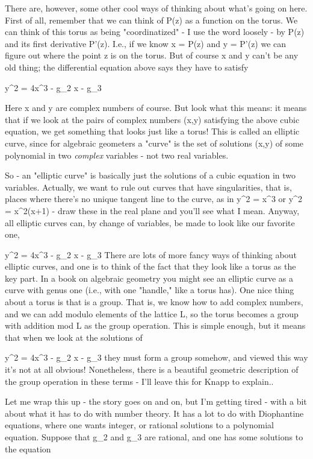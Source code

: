 There are, however, some other cool ways of thinking about what's going
on here.  First of all, remember that we can think of P(z) as a function
on the torus.  We can think of this torus as being "coordinatized" - I
use the word loosely - by P(z) and its first derivative P'(z).  I.e., if
we know x = P(z) and y = P'(z) we can figure out where the point z is on
the torus.  But of course x and y can't be any old thing; the
differential equation above says they have to satisfy

   y^{2} = 4x^{3} - g_{2} x - g_{3}

Here x and y are complex numbers of course.  But look what this means:
it means that if we look at the pairs of complex numbers (x,y)
satisfying the above cubic equation, we get something
that looks just like a torus!  This is called an elliptic curve, since
for algebraic geometers a "curve" is the set of solutions (x,y) of some
polynomial in two \emph{complex} variables - not two real variables.  

So - an "elliptic curve" is basically just the solutions of a cubic equation in
two variables.   Actually, we want to rule out curves that have
singularities, that is, places where there's no unique tangent line to
the curve, as in y^{2} = x^{3} or y^{2} = x^{2}(x+1) - draw these in the real
plane and you'll see what I mean.  Anyway, all elliptic curves can, by
change of variables, be made to look like our favorite one, 


   y^{2} = 4x^{3} - g_{2} x - g_{3}
There are lots of more fancy ways of thinking about elliptic curves, and
one is to think of the fact that they look like a torus as the key part.
In a book on algebraic geometry you might see an elliptic curve as a
curve with genus one (i.e., with one "handle," like a torus has).  One
nice thing about a torus is that is a group.  That is, we know how to
add complex numbers, and we can add modulo elements of the lattice L,
so the torus becomes a group with addition mod L as the group operation.
This is simple enough, but it means that when we look at the solutions
of 

   y^{2} = 4x^{3} - g_{2} x - g_{3}
they must form a group somehow, and viewed this way it's not at all
obvious!  Nonetheless, there is a beautiful geometric description of the
group operation in these terms - I'll leave this for Knapp to explain..

Let me wrap this up - the story goes on and on, but I'm getting tired -
with a bit about what it has to do with number theory.  It has a lot to
do with Diophantine equations, where one wants integer, or rational
solutions to a polynomial equation.  Suppose that 
g_{2} and g_{3} are
rational, and one has some solutions to the equation 


